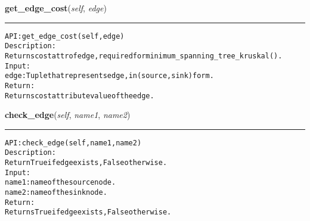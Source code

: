     \label{coinor:gimpy:graph:Graph:get_edge_cost}

    \vspace{0.5ex}

\hspace{.8\funcindent}\begin{boxedminipage}{\funcwidth}

    \raggedright \textbf{get\_edge\_cost}(\textit{self}, \textit{edge})

    \vspace{-1.5ex}

    \rule{\textwidth}{0.5\fboxrule}
\setlength{\parskip}{2ex}
\begin{alltt}

API: get\_edge\_cost(self, edge)
Description:
Returns cost attr of edge, required for minimum\_spanning\_tree\_kruskal().
Input:
    edge: Tuple that represents edge, in (source,sink) form.
Return:
    Returns cost attribute value of the edge.
\end{alltt}

\setlength{\parskip}{1ex}
    \end{boxedminipage}

    \label{coinor:gimpy:graph:Graph:check_edge}

    \vspace{0.5ex}

\hspace{.8\funcindent}\begin{boxedminipage}{\funcwidth}

    \raggedright \textbf{check\_edge}(\textit{self}, \textit{name1}, \textit{name2})

    \vspace{-1.5ex}

    \rule{\textwidth}{0.5\fboxrule}
\setlength{\parskip}{2ex}
\begin{alltt}

API: check\_edge(self, name1, name2)
Description:
Return True if edge exists, False otherwise.
Input:
    name1: name of the source node.
    name2: name of the sink node.
Return:
    Returns True if edge exists, False otherwise.
\end{alltt}

\setlength{\parskip}{1ex}
    \end{boxedminipage}


